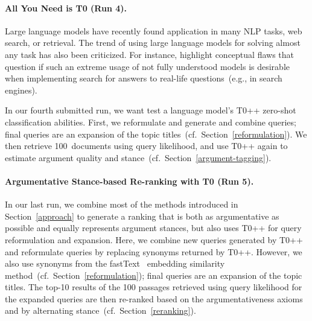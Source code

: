\paragraph{All You Need is T0 (Run 4).}

Large language models have recently found application in many NLP tasks, web search, or retrieval. The trend of using large language models for solving almost any task has also been criticized. For instance, \citet{ShahB2022} highlight conceptual flaws that question if such an extreme usage of not fully understood models is desirable when implementing search for answers to real-life questions~(e.g., in search engines).

In our fourth submitted run, we want test a language model's T0++ zero-shot classification abilities. First, we reformulate and generate and combine queries; final queries are an expansion of the topic titles~(cf.\ Section~\ref{reformulation}).
We then retrieve 100~documents using query likelihood, and use T0++ again to estimate argument quality and stance~(cf.\ Section~\ref{argument-tagging}).

\paragraph{Argumentative Stance-based Re-ranking with T0 (Run 5).}

In our last run, we combine most of the methods introduced in Section~\ref{approach} to generate a ranking that is both as argumentative as possible and equally represents argument stances, but also uses T0++ for query reformulation and expansion.
Here, we combine new queries generated by T0++ and reformulate queries by replacing synonyms returned by T0++. However, we also use synonyms from the fastText~\cite{BojanowskiGJM2017} embedding similarity method~(cf.\ Section~\ref{reformulation}); final queries are an expansion of the topic titles.
The top-10 results of the 100 passages retrieved using query likelihood for the expanded queries are then re-ranked based on the argumentativeness axioms and by alternating stance~(cf.\ Section~\ref{reranking}).